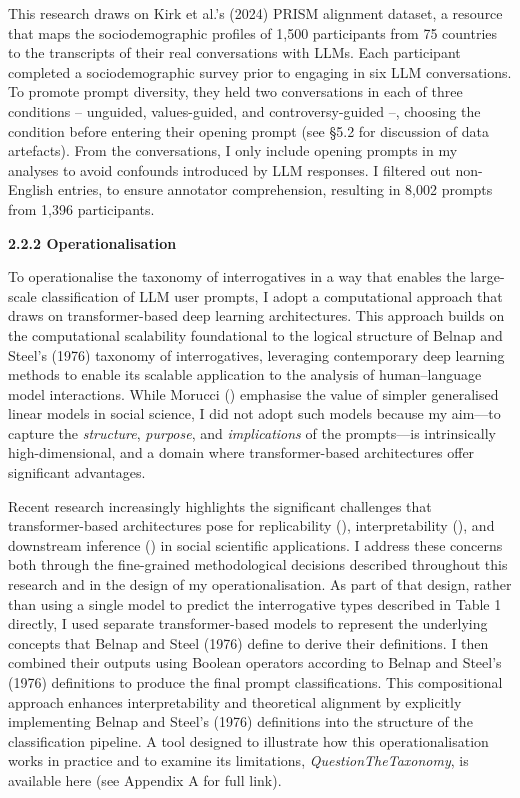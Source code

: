 \documentclass[
  12pt,
]{article}
\begin{document}
This research draws on Kirk et al.'s (2024) PRISM alignment dataset, a resource that maps the sociodemographic profiles of 1,500 participants from 75 countries to the transcripts of their real conversations with LLMs. Each participant completed a sociodemographic survey prior to engaging in six LLM conversations. To promote prompt diversity, they held two conversations in each of three conditions -- unguided, values-guided, and controversy-guided --, choosing the condition before entering their opening prompt (see §5.2 for discussion of data artefacts). From the conversations, I only include opening prompts in my analyses to avoid confounds introduced by LLM responses. I filtered out non-English entries, to ensure annotator comprehension, resulting in 8,002 prompts from 1,396 participants.

\textbf{2.2.2 Operationalisation}

To operationalise the taxonomy of interrogatives in a way that enables the large-scale classification of LLM user prompts, I adopt a computational approach that draws on transformer-based deep learning architectures. This approach builds on the computational scalability foundational to the logical structure of Belnap and Steel's (1976) taxonomy of interrogatives, leveraging contemporary deep learning methods to enable its scalable application to the analysis of human--language model interactions. While Morucci () emphasise the value of simpler generalised linear models in social science, I did not adopt such models because my aim---to capture the \emph{structure}, \emph{purpose}, and \emph{implications} of the prompts---is intrinsically high-dimensional, and a domain where transformer-based architectures offer significant advantages.

Recent research increasingly highlights the significant challenges that transformer-based architectures pose for replicability (), interpretability (), and downstream inference () in social scientific applications. I address these concerns both through the fine-grained methodological decisions described throughout this research and in the design of my operationalisation. As part of that design, rather than using a single model to predict the interrogative types described in Table 1 directly, I used separate transformer-based models to represent the underlying concepts that Belnap and Steel (1976) define to derive their definitions. I then combined their outputs using Boolean operators according to Belnap and Steel's (1976) definitions to produce the final prompt classifications. This compositional approach enhances interpretability and theoretical alignment by explicitly implementing Belnap and Steel's (1976) definitions into the structure of the classification pipeline. A tool designed to illustrate how this operationalisation works in practice and to examine its limitations, \emph{QuestionTheTaxonomy}, is available here (see Appendix A for full link).
\end{document}
